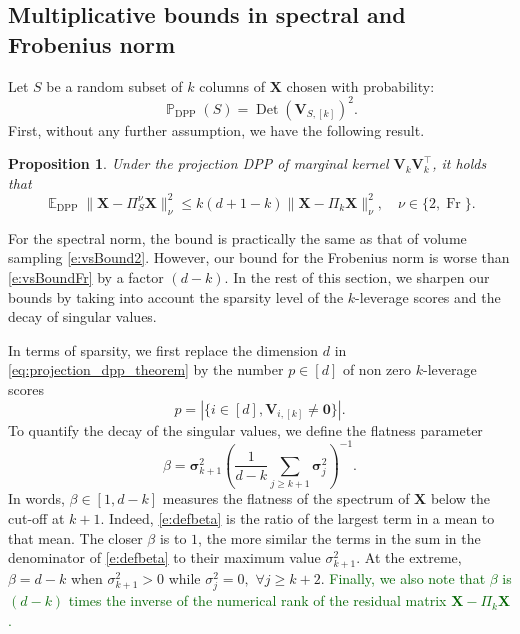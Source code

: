 \documentclass[twoside,11pt]{book}
\newcommand{\rev}[1]{\textcolor{darkgreen}{#1}}
\newtheorem{proposition}{Proposition}
\numberwithin{theorem}{chapter}
\numberwithin{definition}{chapter}
\numberwithin{proposition}{chapter}
\numberwithin{corollary}{chapter}
\numberwithin{example}{chapter}
\numberwithin{lemma}{chapter}
\numberwithin{assumption}{chapter}
\DeclareMathOperator{\Det}{Det}
\DeclareMathOperator{\Fr}{\mathrm{Fr}}
\DeclareMathOperator{\DPP}{\mathrm{DPP}}
\DeclareMathOperator{\Tran}{\intercal}
\DeclareMathOperator{\EX}{\mathbb{E}}
\DeclareMathOperator{\Prb}{\mathbb{P}}
\begin{document}
\subsection{Multiplicative bounds in spectral and Frobenius norm}
\label{sec:new_results_randomized}
Let $S$ be a random subset of $k$ columns of $\bm{X}$ chosen with probability:
\begin{equation}
	\Prb_{\DPP}(S) = \Det(\bm{V}_{S,[k]})^{2}.
\end{equation}
First, without any further assumption, we have the following result.
\begin{proposition}
    \label{projection_dpp_theorem}
    Under the projection DPP of marginal kernel $\bm{V}^{}_{k}\bm{V}^{\Tran}_{k}$, it holds that
    \begin{equation}
    	\label{eq:projection_dpp_theorem}
    	\EX_{\DPP} \| \bm{X} - \Pi_{S}^{\nu}\bm{X} \|_{\nu}^{2} \leq k(d+1-k)\| \bm{X} - \Pi_{k}\bm{X} \|_{\nu}^{2}, \quad \nu\in\{2,\Fr\}.
    \end{equation}
\end{proposition}
For the spectral norm, the bound is practically the same as that of volume sampling \eqref{e:vsBound2}. However, our bound for the Frobenius norm is worse than \eqref{e:vsBoundFr} by a factor $(d-k)$. In the rest of this section, we sharpen our bounds by taking into account the sparsity level of the $k$-leverage scores and the decay of singular values.

In terms of sparsity, we first replace the dimension $d$ in \eqref{eq:projection_dpp_theorem} by the number $p\in[d]$ of non zero $k$-leverage scores
\begin{equation}
  p = \left| \{i \in [d], \bm{V}_{i,[k]} \neq \bm{0}\}\right|.
  \label{e:defp}
\end{equation}
To quantify the decay of the singular values, we define the flatness parameter
\begin{equation}
  \beta = \bm{\sigma}_{k+1}^{2} \left(\frac{1}{d-k} \sum\limits_{j \geq k+1} \bm{\sigma}_{j}^{2}\right)^{-1}.
  \label{e:defbeta}
\end{equation}
In words, $\beta\in[1,d-k]$ measures the flatness of the spectrum of $\bm{X}$ below the cut-off at $k+1$. Indeed, \eqref{e:defbeta} is the ratio of the largest term in a mean to that mean. The closer $\beta$ is to $1$, the more similar the terms in the sum in the denominator of \eqref{e:defbeta} to their maximum value $\sigma_{k+1}^{2}$. At the extreme, $\beta=d-k$ when $\sigma^2_{k+1}>0$ while $\sigma_j^2=0,$ $\forall j\geq k+2$. \rev{Finally, we also note that $\beta$ is $(d-k)$ times the inverse of the numerical rank \citep{RuVe07} of the residual matrix $\bm{X}-\Pi_{k}\bm{X}$.}
\end{document}
